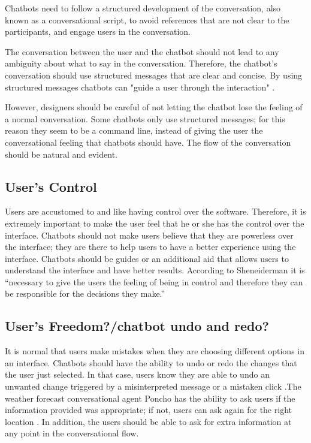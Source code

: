 \documentclass[a4paper,10pt]{article}
\begin{document}
Chatbots need to follow a structured development of the conversation, also known as a conversational script, to avoid references that are not clear to the participants, and engage users in the conversation.

The conversation between the user and the chatbot should not lead to any ambiguity about what to say in the conversation. Therefore, the chatbot's conversation should use structured messages that are clear and concise. By using structured messages chatbots can "guide a user through the interaction" \cite{HeuristicsWebPage}.

However, designers should be careful of not letting the chatbot lose the feeling of a normal conversation. Some chatbots only use structured messages; for this reason they seem to be a command line, instead of giving the user the conversational feeling that chatbots should have. The flow of the conversation should be natural and evident. 


\subsection*{User's Control}

Users are accustomed to and like having control over the software. Therefore, it is extremely important to make the user feel that he or she has the control over the interface. Chatbots should not make users believe that they are powerless over the interface; they are there to help users to have a better experience using the interface. Chatbots should be guides or an additional aid that allows users to understand the interface and have better results. According to Sheneiderman \cite{shneiderman1997direct} it is ``necessary to give the users the feeling of being in control and therefore they can be responsible for the decisions they make.” 

\subsection*{User's Freedom?/chatbot undo and redo? }

It is normal that users make mistakes when they are choosing different options in an interface. Chatbots should have the ability to undo or redo the changes that the user just selected. In that case, users know they are able to undo an unwanted change triggered by a misinterpreted message or a mistaken click \cite{HeuristicsWebPage}.The weather forecast conversational agent Poncho has the ability to ask users if the information provided was appropriate; if not, users can ask again for the right location \cite{poncho2017}. In addition, the users should be able to ask for extra information at any point in the conversational flow.
\end{document}
